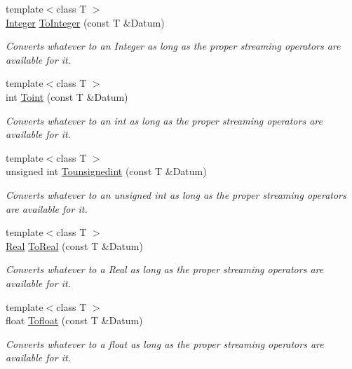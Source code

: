 \begin{DoxyCompactItemize}
{\footnotesize template$<$class T $>$ }\\\hyperlink{namespacephys_a7f09bf5585b2bb97613cd9aad4273a81}{Integer} \hyperlink{namespacephys_a7fe8a4cf645e000483652f26ef8d6e47}{ToInteger} (const T \&Datum)
\begin{DoxyCompactList}\small\item\em Converts whatever to an Integer as long as the proper streaming operators are available for it. \item\end{DoxyCompactList}\item 
{\footnotesize template$<$class T $>$ }\\int \hyperlink{namespacephys_af0a6dfb0aa9e9292b96a0273e1f49d3a}{Toint} (const T \&Datum)
\begin{DoxyCompactList}\small\item\em Converts whatever to an int as long as the proper streaming operators are available for it. \item\end{DoxyCompactList}\item 
{\footnotesize template$<$class T $>$ }\\unsigned int \hyperlink{namespacephys_a16ab66903d5e438a04f4e859c8aa47a7}{Tounsignedint} (const T \&Datum)
\begin{DoxyCompactList}\small\item\em Converts whatever to an unsigned int as long as the proper streaming operators are available for it. \item\end{DoxyCompactList}\item 
{\footnotesize template$<$class T $>$ }\\\hyperlink{namespacephys_af7eb897198d265b8e868f45240230d5f}{Real} \hyperlink{namespacephys_ac5ff9d58be770f2fe8c4928eb160c88a}{ToReal} (const T \&Datum)
\begin{DoxyCompactList}\small\item\em Converts whatever to a Real as long as the proper streaming operators are available for it. \item\end{DoxyCompactList}\item 
{\footnotesize template$<$class T $>$ }\\float \hyperlink{namespacephys_a8f892c12296033f70cc95c43f5c7e85c}{Tofloat} (const T \&Datum)
\begin{DoxyCompactList}\small\item\em Converts whatever to a float as long as the proper streaming operators are available for it. \item\end{DoxyCompactList}\item 

\end{DoxyCompactItemize}
